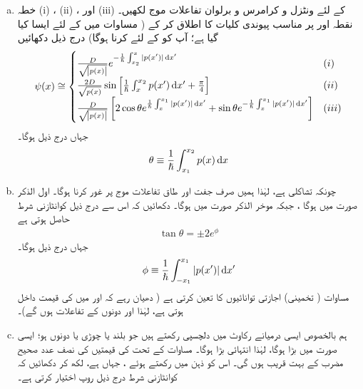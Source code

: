 \begin{enumerate}[a.]

\item
خطہ (i) ، (ii) ،  اور (iii)  کے لئے  ونٹزل و کرامرس و برلوان تفاعلات موج لکھیں۔ نقطہ  اور  پر مناسب پیوندی کلیات کا اطلاق کر کے ( مساوات   میں  کے لئے ایسا کیا گیا ہے؛  آپ کو  کے لئے کرنا ہوگا)  درج ذیل دکھائیں
\begin{align*}
	\psi(x)\cong
	\begin{cases}
		\frac{D}{\sqrt{\abs{p(x)}}} e^{-\frac{1}{\hslash}\int^{x}_{x_{2}}|p(x')|\dif x'}& (i) \\
		\frac{2D}{\sqrt{p(x)}} \sin\left[\frac{1}{\hslash}\int^{x_{2}}_{x}p(x')\dif x'+\frac{\pi}{4}\right]& (ii) \\
		\frac{D}{\sqrt{\abs{p(x)}}}\left[2 \cos\theta e^{\frac{1}{\hslash}\int^{x_{1}}_{x}|p(x')|\dif x'} +\sin\theta e^{-\frac{1}{\hslash}\int^{x_{1}}_{x}|p(x')|\dif x'}\right]& (iii)
	\end{cases}
\end{align*}
جہاں درج ذیل ہوگا۔
\begin{align}\label{مساوات_وقب_تھیٹا}
	\theta\equiv\frac{1}{\hslash}\int^{x_{2}}_{x_{1}}p(x)\dif  x
\end{align}
\item
چونکہ  تشاکلی ہے،  لہٰذا ہمیں صرف جفت  اور طاق  تفاعلات موج پر غور کرنا ہوگا۔ اول الذکر صورت میں  ہوگا ، جبکہ موخر الذکر صورت میں  ہوگا۔ دکھائیں کہ اس سے درج ذیل کوانٹازنی شرط حاصل ہوتی ہے
\begin{align}\label{مساوات_وقب_ٹینجنٹ}
	\tan\theta=\pm 2e^{\phi}
\end{align}
جہاں درج ذیل ہوگا۔
\begin{align}
	\phi\equiv\frac{1}{\hslash}\int^{x_{1}}_{-x_{1}}|p(x')|\dif x'
\end{align}
مساوات  (  تخمینی)  اجازتی توانائیوں کا  تعین کرتی ہے ( دھیان رہے کہ   اور  میں  کی قیمت داخل ہوتی ہے،  لہٰذا  اور  دونوں  کے تفاعلات ہوں گے)۔
\item
 ہم بالخصوص ایسی درمیانے  رکاوٹ میں دلچسپی رکھتے ہیں جو بلند یا چوڑی یا   دونوں ہو؛ ایسی صورت میں  بڑا ہوگا،  لہٰذا  انتہائی بڑا ہوگا۔  مساوات   کے تحت  کی قیمتیں  کی نصف عدد صحیح مضرب کے بہت قریب ہوں گی۔ اس کو ذہن میں رکھتے ہوئے ،  جہاں  ہے،  لکھ کر دکھائیں کہ کوانٹازنی شرط درج ذیل روپ اختیار کرتی ہے۔

\end{enumerate}
